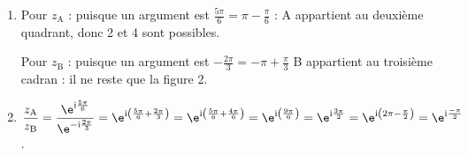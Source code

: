 \medskip

\begin{enumerate}
\item Pour $z_{\text{A}}$ : puisque un argument est $\frac{5\pi}{6} = \pi - \frac{\pi}{6}$ : A appartient au deuxième quadrant, donc 2 et 4 sont possibles.

Pour $z_{\text{B}}$ : puisque un argument est $-\frac{2\pi}{3} = - \pi + \frac{\pi}{3}$ B appartient au troisième cadran : il ne reste que la figure 2. 

\item $\dfrac{z_{\text A}}{z_{\text B}} = \dfrac{\e^{\text{i} \frac{5\pi}{6}}}{\e^{-\text{i} \frac{2\pi}{3}}} = \e^{\text{i} \left(\frac{5\pi}{6} + \frac{2\pi}{3}\right)} = \e^{\text{i} \left(\frac{5\pi}{6} + \frac{4\pi}{6}\right)} = \e^{\text{i} \left(\frac{9\pi}{6}\right)} = \e^{\text{i} \frac{3\pi}{2}} = \e^{\text{i} \left(2\pi - \frac{\pi}{2}\right)}  = \e^{\text{i} \frac{-\pi}{2}}$.
\end{enumerate}

\bigskip
